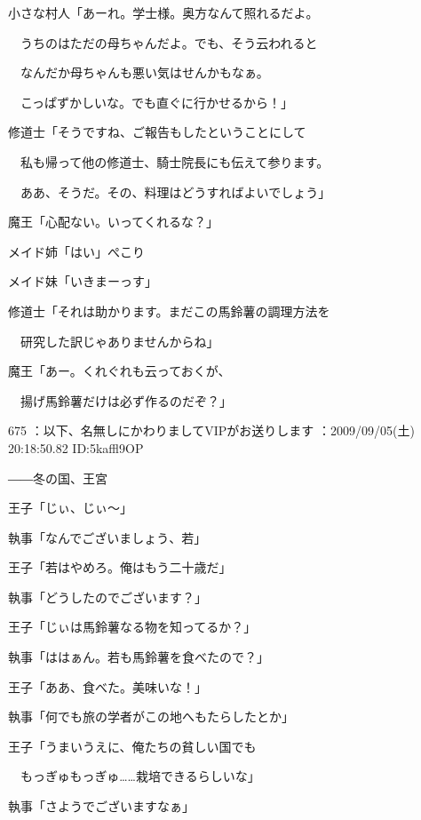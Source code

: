 \documentclass[a4j,twocolumn]{tarticle}
\begin{document}
小さな村人「あーれ。学士様。奥方なんて照れるだよ。\par{} 
　うちのはただの母ちゃんだよ。でも、そう云われると\par{} 
　なんだか母ちゃんも悪い気はせんかもなぁ。\par{} 
　こっぱずかしいな。でも直ぐに行かせるから！」 



修道士「そうですね、ご報告もしたということにして\par{} 
　私も帰って他の修道士、騎士院長にも伝えて参ります。\par{} 
　ああ、そうだ。その、料理はどうすればよいでしょう」 



魔王「心配ない。いってくれるな？」 



メイド姉「はい」ぺこり\par{} 
メイド妹「いきまーっす」 



修道士「それは助かります。まだこの馬鈴薯の調理方法を\par{} 
　研究した訳じゃありませんからね」 



魔王「あー。くれぐれも云っておくが、\par{} 
　揚げ馬鈴薯だけは必ず作るのだぞ？」 

	
    
    

675 ：以下、名無しにかわりましてVIPがお送りします ：2009/09/05(土) 20:18:50.82 ID:5kaffl9OP 


――冬の国、王宮 



王子「じぃ、じぃ～」\par{} 
執事「なんでございましょう、若」 



王子「若はやめろ。俺はもう二十歳だ」\par{} 
執事「どうしたのでございます？」 



王子「じぃは馬鈴薯なる物を知ってるか？」\par{} 
執事「ははぁん。若も馬鈴薯を食べたので？」 



王子「ああ、食べた。美味いな！」\par{} 
執事「何でも旅の学者がこの地へもたらしたとか」 



王子「うまいうえに、俺たちの貧しい国でも\par{} 
　もっぎゅもっぎゅ……栽培できるらしいな」\par{} 
執事「さようでございますなぁ」 
\end{document}
